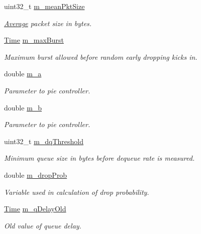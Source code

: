 \begin{DoxyCompactItemize}
uint32\+\_\+t \hyperlink{classns3_1_1PieQueueDisc_a02068aca097b0bd7aba59f734ed5571e}{m\+\_\+mean\+Pkt\+Size}
\begin{DoxyCompactList}\small\item\em \hyperlink{classns3_1_1Average}{Average} packet size in bytes. \end{DoxyCompactList}\item 
\hyperlink{classns3_1_1Time}{Time} \hyperlink{classns3_1_1PieQueueDisc_a3eed3c319ffb19556aedd333da047954}{m\+\_\+max\+Burst}
\begin{DoxyCompactList}\small\item\em Maximum burst allowed before random early dropping kicks in. \end{DoxyCompactList}\item 
double \hyperlink{classns3_1_1PieQueueDisc_aa7302b5d199b328f69ddfdb00858ff98}{m\+\_\+a}
\begin{DoxyCompactList}\small\item\em Parameter to pie controller. \end{DoxyCompactList}\item 
double \hyperlink{classns3_1_1PieQueueDisc_aebef26b64ae9bb0f1f151820f9621ce1}{m\+\_\+b}
\begin{DoxyCompactList}\small\item\em Parameter to pie controller. \end{DoxyCompactList}\item 
uint32\+\_\+t \hyperlink{classns3_1_1PieQueueDisc_a010bb75fa254f100eece3b71825aa5cc}{m\+\_\+dq\+Threshold}
\begin{DoxyCompactList}\small\item\em Minimum queue size in bytes before dequeue rate is measured. \end{DoxyCompactList}\item 
double \hyperlink{classns3_1_1PieQueueDisc_a532858948ab061df8daceaa7c798814d}{m\+\_\+drop\+Prob}
\begin{DoxyCompactList}\small\item\em Variable used in calculation of drop probability. \end{DoxyCompactList}\item 
\hyperlink{classns3_1_1Time}{Time} \hyperlink{classns3_1_1PieQueueDisc_a4ea9c1bd8d6ae539f93822b8a47163bd}{m\+\_\+q\+Delay\+Old}
\begin{DoxyCompactList}\small\item\em Old value of queue delay. \end{DoxyCompactList}\item 

\end{DoxyCompactItemize}

